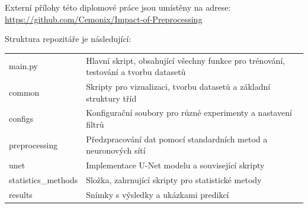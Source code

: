 \documentclass[male,czech,api_ing]{thesis}
\begin{document}


Externí přílohy této diplomové práce jsou umístěny na adrese: \\
\url{https://github.com/Cemonix/Impact-of-Preprocessing}

Struktura repozitáře je následující:
\begin{longtable}{ll}
\hline
main.py & Hlavní skript, obsahující všechny funkce pro trénování, testování a tvorbu datasetů \\
common & Skripty pro vizualizaci, tvorbu datasetů a základní struktury tříd \\
configs & Konfigurační soubory pro různé experimenty a nastavení filtrů \\
preprocessing & Předzpracování dat pomocí standardních metod a neuronových sítí \\
unet & Implementace U-Net modelu a související skripty \\
statistics\_methods & Složka, zahrnující skripty pro statistické metody \\
results & Snímky s výsledky a ukázkami predikcí \\
\hline
\end{longtable}

\end{document}
